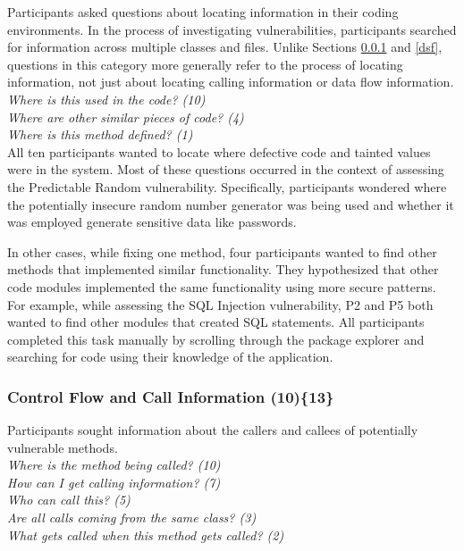 \documentclass{sig-alternate}
\begin{document}
Participants asked questions about locating information in their coding environments.
In the process of investigating vulnerabilities, participants searched for information across multiple classes and files.
Unlike Sections \ref{cf} and \ref{dsf}, questions in this category more generally refer to the process of locating information, not just about locating calling information or data flow information.
\\

\noindent\emph{Where is this used in the code? (10)} \\
\emph{Where are other similar pieces of code? (4)} \\
\emph{Where is this method defined? (1)} 
\\

All ten participants wanted to locate where defective code and tainted values were in the system. 
Most of these questions occurred in the context of assessing the Predictable Random vulnerability.
Specifically, participants wondered where the potentially insecure random number generator was being used and whether it was employed generate sensitive data like passwords.

In other cases, while fixing one method, four participants wanted to find other methods that implemented similar functionality.
They hypothesized that other code modules implemented the same functionality using more secure patterns. 
For example, while assessing the SQL Injection vulnerability, P2 and P5 both wanted to find other modules that created SQL statements.
All participants completed this task manually by scrolling through the package explorer and searching for code using their knowledge of the application.



\subsubsection{\textbf{Control Flow and Call Information (10)\{13\}}}\label{cf}
Participants sought information about the callers and callees of potentially vulnerable methods.
\\

\noindent\emph{Where is the method being called? (10)} \\
\emph{How can I get calling information? (7)} \\
\emph{Who can call this? (5)} \\
\emph{Are all calls coming from the same class? (3)} \\
\emph{What gets called when this method gets called? (2)}
\\
\end{document}
